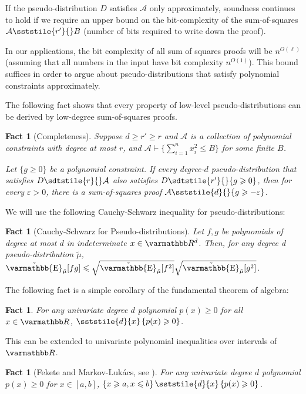 \documentclass{article}
\newtheorem{fact}[theorem]{Fact}
\theoremstyle{definition}
\theoremstyle{remark}
\let\mathbb\varmathbb
\newcommand{\Set}[1]{\left\{#1\right\}}
\newcommand{\R}{\mathbb R}
\newcommand{\cA}{\mathcal A}
\renewcommand{\leq}{\leqslant}
\renewcommand{\geq}{\geqslant}
\let\epsilon=\varepsilon
\numberwithin{equation}{section}
\DeclareMathOperator{\pE}{\tilde{\mathbb{E}}}
\newcommand{\1}{\bm{1}}
\newcommand{\tmu}{\tilde{\mu}}
\begin{document}
If the pseudo-distribution $D$ satisfies $\cA$ only approximately, soundness continues to hold if we require an upper bound on the bit-complexity of the sum-of-squares $\cA \sststile{r'}{} B$  (number of bits required to write down the proof).

In our applications, the bit complexity of all sum of squares proofs will be $n^{O(\ell)}$ (assuming that all numbers in the input have bit complexity $n^{O(1)}$).
This bound suffices in order to argue about pseudo-distributions that satisfy polynomial constraints approximately.

The following fact shows that every property of low-level pseudo-distributions can be derived by low-degree sum-of-squares proofs.

\begin{fact}[Completeness]
	\label{fact:sos-completeness}
	Suppose $d \geq r' \geq r$ and $\cA$ is a collection of polynomial constraints with degree at most $r$, and $\cA \vdash \{ \sum_{i = 1}^n x_i^2 \leq B\}$ for some finite $B$.
	
	Let $\{g \geq 0 \}$ be a polynomial constraint.
	If every degree-$d$ pseudo-distribution that satisfies $D \sdtstile{r}{} \cA$ also satisfies $D \sdtstile{r'}{} \{g \geq 0 \}$, then for every $\epsilon > 0$, there is a sum-of-squares proof $\cA \sststile{d}{} \{g \geq - \epsilon \}$.
\end{fact}

We will use the following Cauchy-Schwarz inequality for pseudo-distributions:

\begin{fact}[Cauchy-Schwarz for Pseudo-distributions]
	Let $f,g$ be polynomials of degree at most $d$ in indeterminate $x \in \R^d$. Then, for any degree d pseudo-distribution $\tmu$,
	$\pE_{\tmu}[fg] \leq \sqrt{\pE_{\tmu}[f^2]} \sqrt{\pE_{\tmu}[g^2]}$.
	\label{fact:pseudo-expectation-cauchy-schwarz}
\end{fact} 

The following fact is a simple corollary of the fundamental theorem of algebra:
\begin{fact}
	For any univariate degree $d$ polynomial $p(x) \geq 0$ for all $x \in \R$, 
	$\sststile{d}{x} \Set{p(x) \geq 0}$.
	\label{fact:univariate}
\end{fact}

This can be extended to univariate polynomial inequalities over intervals of $\R$. 

\begin{fact}[Fekete and Markov-Lukács, see \cite{laurent2009sums}]
	For any univariate degree $d$ polynomial $p(x) \geq 0$ for $x \in [a, b]$,  $\Set{x\geq a, x \leq b} \sststile{d}{x} \Set{p(x) \geq 0}$.  \label{fact:univariate-interval}
\end{fact}



{}


\end{document}
